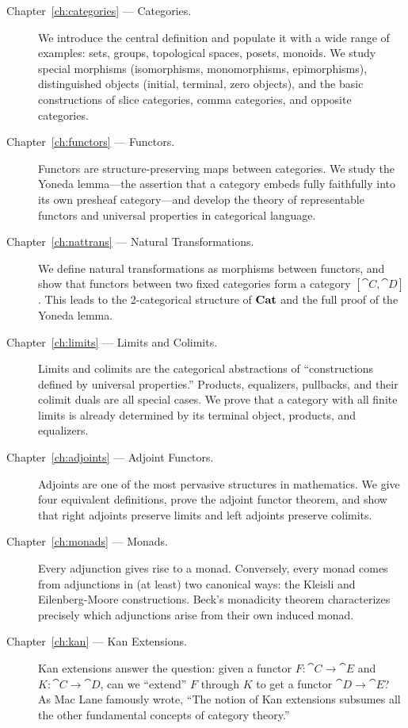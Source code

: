 \begin{description}
  \item[Chapter~\ref{ch:categories} — Categories.] We introduce the central definition and populate it with a wide range of examples: sets, groups, topological spaces, posets, monoids. We study special morphisms (isomorphisms, monomorphisms, epimorphisms), distinguished objects (initial, terminal, zero objects), and the basic constructions of slice categories, comma categories, and opposite categories.

  \item[Chapter~\ref{ch:functors} — Functors.] Functors are structure-preserving maps between categories. We study the Yoneda lemma—the assertion that a category embeds fully faithfully into its own presheaf category—and develop the theory of representable functors and universal properties in categorical language.

  \item[Chapter~\ref{ch:nattrans} — Natural Transformations.] We define natural transformations as morphisms between functors, and show that functors between two fixed categories form a category $[\cat{C}, \cat{D}]$. This leads to the 2-categorical structure of $\mathbf{Cat}$ and the full proof of the Yoneda lemma.

  \item[Chapter~\ref{ch:limits} — Limits and Colimits.] Limits and colimits are the categorical abstractions of ``constructions defined by universal properties.'' Products, equalizers, pullbacks, and their colimit duals are all special cases. We prove that a category with all finite limits is already determined by its terminal object, products, and equalizers.

  \item[Chapter~\ref{ch:adjoints} — Adjoint Functors.] Adjoints are one of the most pervasive structures in mathematics. We give four equivalent definitions, prove the adjoint functor theorem, and show that right adjoints preserve limits and left adjoints preserve colimits.

  \item[Chapter~\ref{ch:monads} — Monads.] Every adjunction gives rise to a monad. Conversely, every monad comes from adjunctions in (at least) two canonical ways: the Kleisli and Eilenberg-Moore constructions. Beck's monadicity theorem characterizes precisely which adjunctions arise from their own induced monad.

  \item[Chapter~\ref{ch:kan} — Kan Extensions.] Kan extensions answer the question: given a functor $F: \cat{C} \to \cat{E}$ and $K: \cat{C} \to \cat{D}$, can we ``extend'' $F$ through $K$ to get a functor $\cat{D} \to \cat{E}$? As Mac Lane famously wrote, ``The notion of Kan extensions subsumes all the other fundamental concepts of category theory.''


\end{description}
